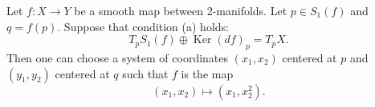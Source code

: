 Let $f: X \to Y$ be a smooth map between 2-manifolds. Let $p \in S_1(f)$ and $q = f(p)$. Suppose that condition (a) holds:
$$T_p S_1(f) \oplus \operatorname{Ker}(df)_p = T_p X.$$
Then one can choose a system of coordinates $(x_1, x_2)$ centered at $p$ and $(y_1, y_2)$ centered at $q$ such that $f$ is the map
$$(x_1, x_2) \mapsto (x_1, x_2^2).$$
